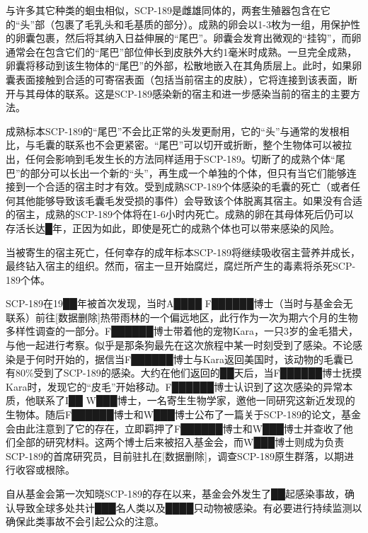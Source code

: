 与许多其它种类的蛔虫相似，SCP-189是雌雄同体的，两套生殖器包含在它的“头”部（包裹了毛乳头和毛基质的部分）。成熟的卵会以1-3枚为一组，用保护性的卵囊包裹，然后将其纳入日益伸展的“尾巴”。卵囊会发育出微观的“挂钩”，而卵通常会在包含它们的“尾巴”部位伸长到皮肤外大约1毫米时成熟。一旦完全成熟，卵囊将移动到该生物体的“尾巴”的外部，松散地嵌入在其角质层上。此时，如果卵囊表面接触到合适的可寄宿表面（包括当前宿主的皮肤），它将连接到该表面，断开与其母体的联系。这是SCP-189感染新的宿主和进一步感染当前的宿主的主要方法。

成熟标本SCP-189的“尾巴”不会比正常的头发更耐用，它的“头”与通常的发根相比，与毛囊的联系也不会更紧密。“尾巴”可以切开或折断，整个生物体可以被拉出，任何会影响到毛发生长的方法同样适用于SCP-189。切断了的成熟个体“尾巴”的部分可以长出一个新的“头”，再生成一个单独的个体，但只有当它们能够连接到一个合适的宿主时才有效。受到成熟SCP-189个体感染的毛囊的死亡（或者任何其他能够导致该毛囊毛发受损的事件）会导致该个体脱离其宿主。如果没有合适的宿主，成熟的SCP-189个体将在1-6小时内死亡。成熟的卵在其母体死后仍可以存活长达█年，正因为如此，即使是死亡的成熟个体也可以带来感染的风险。

当被寄生的宿主死亡，任何幸存的成年标本SCP-189将继续吸收宿主营养并成长，最终钻入宿主的组织。然而，宿主一旦开始腐烂，腐烂所产生的毒素将杀死SCP-189个体。

SCP-189在19██年被首次发现，当时A████ F██████博士（当时与基金会无联系）前往{[}数据删除]热带雨林的一个偏远地区，此行作为一次为期六个月的生物多样性调查的一部分。F██████博士带着他的宠物Kara，一只3岁的金毛猎犬，与他一起进行考察。似乎是那条狗最先在这次旅程中某一时刻受到了感染。不论感染是于何时开始的，据信当F██████博士与Kara返回美国时，该动物的毛囊已有80\%受到了SCP-189的感染。大约在他们返回的██天后，当F██████博士抚摸Kara时，发现它的“皮毛”开始移动。F██████博士认识到了这次感染的异常本质，他联系了I██ W███博士，一名寄生生物学家，邀他一同研究这新近发现的生物体。随后F██████博士和W███博士公布了一篇关于SCP-189的论文，基金会由此注意到了它的存在，立即羁押了F██████博士和W███博士并查收了他们全部的研究材料。这两个博士后来被招入基金会，而W███博士则成为负责SCP-189的首席研究员，目前驻扎在{[}数据删除]，调查SCP-189原生群落，以期进行收容或根除。

自从基金会第一次知晓SCP-189的存在以来，基金会外发生了██起感染事故，确认导致全球多处共计███名人类以及████只动物被感染。有必要进行持续监测以确保此类事故不会引起公众的注意。
